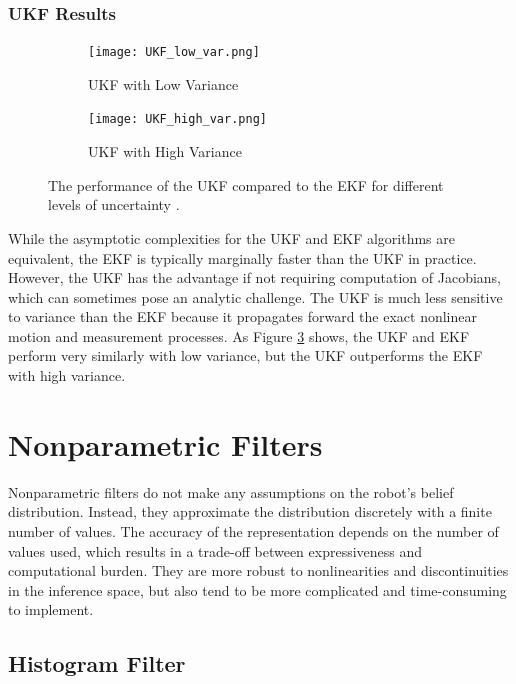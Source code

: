 \documentclass[twoside]{article}
\begin{document}
\subsubsection{UKF Results}
\begin{figure}[t]
\centering
\begin{subfigure}{.5\textwidth}
  \centering
  \texttt{[image: UKF\_low\_var.png]}
  \caption{UKF with Low Variance}
  \label{fig:UKF_low}
\end{subfigure}%
\begin{subfigure}{.5\textwidth}
  \centering
  \texttt{[image: UKF\_high\_var.png]}
  \caption{UKF with High Variance}
  \label{fig:UKF_high}
\end{subfigure}
\caption{The performance of the UKF compared to the EKF for different levels of uncertainty \cite{Xmisc}.}
\label{fig:UKF_variance}
\end{figure}
While the asymptotic complexities for the UKF and EKF algorithms are equivalent, the EKF is typically marginally faster than the UKF in practice. However, the UKF has the advantage if not requiring computation of Jacobians, which can sometimes pose an analytic challenge. The UKF is much less sensitive to variance than the EKF because it propagates forward the exact nonlinear motion and measurement processes. As Figure \ref{fig:UKF_variance} shows, the UKF and EKF perform very similarly with low variance, but the UKF outperforms the EKF with high variance.


\section{Nonparametric Filters}
Nonparametric filters do not make any assumptions on the robot's belief distribution. Instead, they approximate the distribution discretely with a finite number of values. The accuracy of the representation depends on the number of values used, which results in a trade-off between expressiveness and computational burden. They are more robust to nonlinearities and discontinuities in the inference space, but also tend to be more complicated and time-consuming to implement.

\subsection{Histogram Filter}
\end{document}
